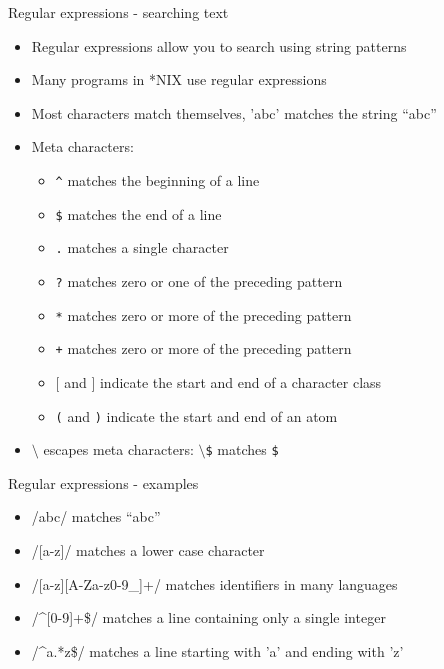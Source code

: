 \documentclass[t]{beamer}
\begin{document}
\begin{frame}{Regular expressions - searching text}
  \begin{itemize}
  \item Regular expressions allow you to search using string patterns
  \item Many programs in *NIX use regular expressions
  \item Most characters match themselves, 'abc' matches the
    string  ``abc''
  \item Meta characters:
    \begin{itemize}
    \item \texttt{\^{ }}  matches the beginning of a line
    \item \texttt{\$} matches the end of a line
    \item \texttt{.} matches a single character
    \item \texttt{?} matches zero or one of the preceding pattern
    \item \texttt{*} matches zero or more of the preceding pattern
    \item \texttt{+} matches zero or more of the preceding pattern
    \item \texttt{$\lbrack$} and \texttt{$\rbrack$} indicate the start and end of a character class
    \item \texttt{(} and \texttt{)} indicate the start and end of an atom
    \end{itemize}
  \item \texttt{$\setminus$} escapes meta characters: \texttt{$\setminus$\$} matches \texttt{\$}
  \end{itemize}
  
\end{frame}

\begin{frame}{Regular expressions - examples}
  \begin{itemize}
  \item /abc/  matches ``abc''
  \item /[a-z]/ matches a lower case character
  \item /[a-z][A-Za-z0-9\_]+/ matches identifiers in many languages
  \item /\^{ }[0-9]+\$/ matches a line containing only a single integer
  \item /\^{ }a.*z\$/ matches a line starting with 'a' and ending with 'z'
  \end{itemize}
  \note{}
\end{frame}
\end{document}
